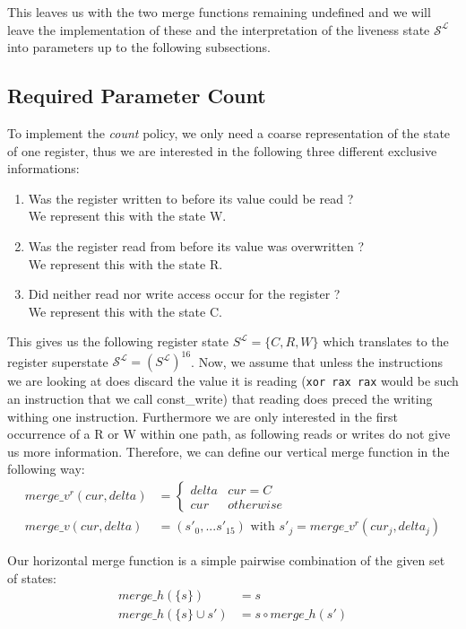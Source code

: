 This leaves us with the two merge functions remaining undefined and we will leave the implementation of these and the interpretation of the liveness state $\mathcal{S}^\mathcal{L}$ into parameters up to the following subsections.

\subsection{Required Parameter Count}
\label{subsection:requiredparamcount}

To implement the \emph{count} policy, we only need a coarse representation of the state of one register, thus we are interested in the following three different exclusive informations:
\begin{enumerate}
\item Was the register written to before its value could be read ? \\ We represent this with the state W.
\item Was the register read from before its value was overwritten ? \\ We represent this with the state R.
\item Did neither read nor write access occur for the register ? \\ We represent this with the state C.
\end{enumerate}
This gives us the following register state $S^\mathcal{L} = \{ C, R, W \}$ which translates to the register superstate $\mathcal{S}^\mathcal{L} = (S^\mathcal{L})^{16}$.
Now, we assume that unless the instructions we are looking at does discard the value it is reading (\texttt{xor rax rax} would be such an instruction that we call const\_write) that reading does preced the writing withing one instruction. Furthermore we are only interested in the first occurrence of a R or W within one path, as following reads or writes do not give us more information.
Therefore, we can define our vertical merge function in the following way:
\begin{align}
merge\_v^{r} (cur, delta) &= \left\{
  \begin{array}{lr}
     delta & cur = C \\
     cur & otherwise
  \end{array}
\right. \\
merge\_v (cur, delta) &= (s'_0, ... s'_15) \text { with } s'_j = merge\_v^{r}(cur_j, delta_j)
\end{align}


Our horizontal merge function is a simple pairwise combination of the given set of states:
\begin{align}
merge\_h(\{s\}) &= s\\
merge\_h(\{s\} \cup s') &= s \circ merge\_h(s')
\end{align}

